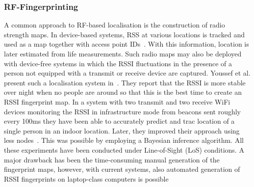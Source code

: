 \documentclass[journal]{IEEEtran}
\begin{document}
\begin{figure*}
\subsubsection{RF-Fingerprinting}\label{sectionRFFingerprinting}
A common approach to RF-based localisation is the construction of radio strength maps.
In device-based systems, RSS at various locations is tracked and used as a map together with access point IDs~\cite{Pervasive_Jeon_2013}.
With this information, location is later estimated from life measurements.
Such radio maps may also be deployed with device-free systems in which the RSSI fluctuations in the presence of a person not equipped with a transmit or receive device are captured. 
Youssef et al. present such a localisation system in~\cite{Pervasive_Youssef_2007}.
They report that the RSSI is more stable over night when no people are around so that this is the best time to create an RSSI fingerprint map. 
In a system with two transmit and two receive WiFi devices monitoring the RSSI in infrastructure mode from beacons sent roughly every 100ms they have been able to accurately predict and trac location of a single person in an indoor location.
Later, they improved their approach using less nodes~\cite{Pervasive_Seifeldin_2009}.
This was possible by employing a Bayesian inference algorithm.
All these experiments have been conducted under Line-of-Sight (LoS) conditions.
A major drawback has been the time-consuming manual generation of the fingerprint maps, however, with current systems, also automated generation of RSSI fingerprints on laptop-class computers is possible~\cite{Pervasive_Seifeldin_2013} 
 

\end{figure*}
\end{document}
